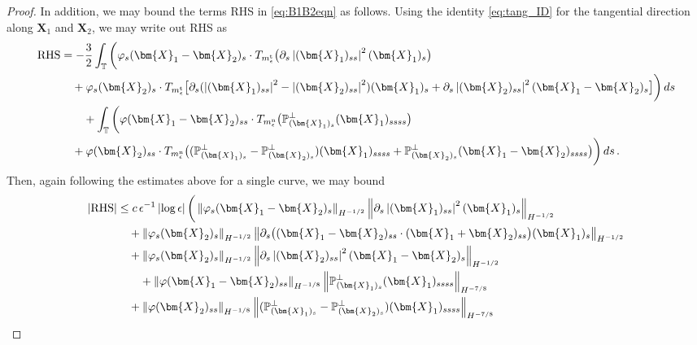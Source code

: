 \documentclass[11pt,reqno]{amsart}
\newcommand{\T}{\mathbb{T}}
\renewcommand{\P}{\mathbb{P}}
\newcommand{\X}{\bm{X}}
\newcommand{\bv}{\bm{v}}
\newcommand{\p}{\partial}
\newcommand{\abs}[1]{\left\lvert #1 \right\rvert}
\newcommand{\norm}[1]{\left\lVert #1 \right\rVert}
\numberwithin{equation}{section}
\theoremstyle{definition}
\begin{document}
\begin{proof}



In addition, we may bound the terms RHS in \eqref{eq:B1B2eqn} as follows. Using the identity \eqref{eq:tang_ID} for the tangential direction along $\X_1$ and $\X_2$, we may write out RHS as
\begin{equation}
\begin{aligned}
  {\rm RHS} &= -\frac{3}{2}\int_\T\bigg( \varphi_s(\X_1-\X_2)_s\cdot T_{m_\epsilon^{\rm t}} \big(\p_s\abs{(\X_1)_{ss}}^2(\X_1)_s \big) \\
  &\quad + \varphi_s(\X_2)_s\cdot T_{m_\epsilon^{\rm t}} \big[\p_s(\abs{(\X_1)_{ss}}^2-\abs{(\X_2)_{ss}}^2)(\X_1)_s +\p_s\abs{(\X_2)_{ss}}^2(\X_1-\X_2)_s \big] \bigg)\,ds \\
  &\qquad +\int_\T\bigg( \varphi(\X_1-\X_2)_{ss}\cdot T_{m_\epsilon^{\rm n}} \big(\P_{(\X_1)_s}^\perp(\X_1)_{ssss}\big)\\
  &\quad + \varphi(\X_2)_{ss}\cdot T_{m_\epsilon^{\rm n}}\big( (\P_{(\X_1)_s}^\perp-\P_{(\X_2)_s}^\perp)(\X_1)_{ssss}+ \P_{(\X_2)_s}^\perp(\X_1-\X_2)_{ssss}\big)\bigg)\,ds\,.
\end{aligned}
\end{equation}
%
%
Then, again following the estimates above for a single curve, we may bound
\begin{equation}
\begin{aligned}
  \abs{{\rm RHS}} &\le c\,\epsilon^{-1}\abs{\log\epsilon}\bigg( \norm{\varphi_s(\X_1-\X_2)_s}_{H^{-1/2}}\norm{\p_s\abs{(\X_1)_{ss}}^2(\X_1)_s}_{H^{-1/2}} \\
  &\quad + \norm{\varphi_s(\X_2)_s}_{H^{-1/2}} \norm{\p_s\big((\X_1-\X_2)_{ss}\cdot(\X_1+\X_2)_{ss}\big)(\X_1)_s}_{H^{-1/2}}  \\
  &\quad + \norm{\varphi_s(\X_2)_s}_{H^{-1/2}} \norm{\p_s\abs{(\X_2)_{ss}}^2(\X_1-\X_2)_s }_{H^{-1/2}}  \\
  &\qquad + \norm{\varphi(\X_1-\X_2)_{ss}}_{H^{-1/8}}\norm{\P_{(\X_1)_s}^\perp(\X_1)_{ssss}}_{H^{-7/8}}\\
  &\quad + \norm{\varphi(\X_2)_{ss}}_{H^{-1/8}} \norm{(\P_{(\X_1)_s}^\perp-\P_{(\X_2)_s}^\perp)(\X_1)_{ssss}}_{H^{-7/8}} \\

\end{aligned}
\end{equation}
\end{proof}
\end{document}
